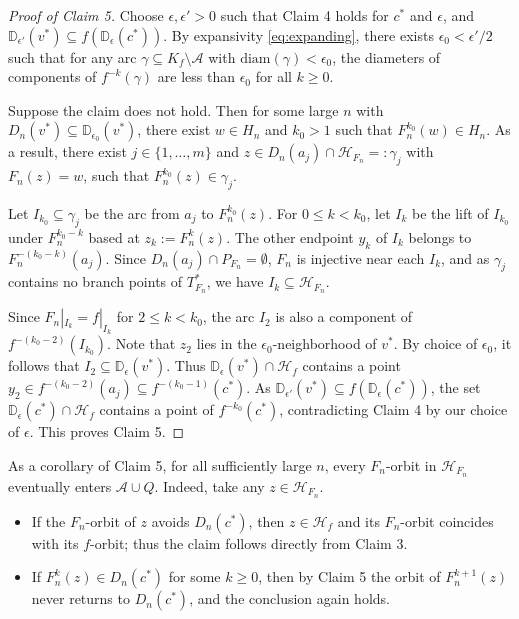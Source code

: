 \documentclass[a4paper,reqno,times, 11pt]{amsart}
\theoremstyle{remark}
\theoremstyle{plain}
\numberwithin{equation}{section}
\def\D{\mathbb D}
\begin{document}
		
		\begin{proof}[Proof of Claim 5]
		 
			\vspace{1pt}
			
			Choose $\epsilon, \epsilon' > 0$ such that Claim 4 holds for $c^*$ and $\epsilon$, and $\D_{\epsilon'}(v^*) \subseteq f(\D_\epsilon(c^*))$. By expansivity \eqref{eq:expanding}, there exists $\epsilon_0 < \epsilon'/2$ such that for any arc $\gamma \subseteq K_f \setminus \mathcal{A}$ with $\mathrm{diam}(\gamma) < \epsilon_0$, the diameters of components of $f^{-k}(\gamma)$ are less than $\epsilon_0$ for all $k \geq 0$.
			

			

				Suppose the claim does not hold. Then for some large $n$ with $D_n(v^*)\subseteq \D_{\epsilon_0}(v^*)$, there exist $w \in H_n$ and $k_0 > 1$ such that $F_n^{k_0}(w) \in H_n$. As a result, there exist $j \in \{1,\ldots,m\}$ and $z \in D_n(a_j) \cap \mathcal{H}_{F_n}=:\gamma_j$ with $F_n(z) = w$, such that $F_n^{k_0}(z) \in \gamma_j$.
				
				Let $I_{k_0} \subseteq \gamma_j$ be the arc from $a_j$ to $F_n^{k_0}(z)$. For $0 \leq k < k_0$, let $I_k$ be the lift of $I_{k_0}$ under $F_n^{k_0-k}$ based at $z_k := F_n^k(z)$. The other endpoint $y_k$ of $I_k$ belongs to $F_n^{-(k_0-k)}(a_j)$. Since $D_n(a_j) \cap P_{F_n} = \emptyset$,  $F_n$ is injective near each $I_k$, and as $\gamma_j$ contains no branch points of $T_{F_n}^*$, we have $I_k \subseteq \mathcal{H}_{F_n}$. 
				
				Since $F_n|_{I_k} = f|_{I_k}$ for $2 \leq k < k_0$, the arc $I_2$ is also a component of $f^{-(k_0-2)}(I_{k_0})$. Note that $z_2$ lies in the $\epsilon_0$-neighborhood of $v^*$. By choice of $\epsilon_0$, it follows that $I_2 \subseteq \D_\epsilon(v^*)$. Thus $\D_\epsilon(v^*) \cap \mathcal{H}_f$ contains a point $y_2 \in f^{-(k_0-2)}(a_j) \subseteq f^{-(k_0-1)}(c^*)$. As $\D_{\epsilon'}(v^*) \subseteq f(\D_\epsilon(c^*))$, the set $\D_\epsilon(c^*) \cap \mathcal{H}_f$ contains a point of $f^{-k_0}(c^*)$, contradicting Claim 4 by our choice of $\epsilon$. This proves  Claim 5.
		\end{proof}
		
As a corollary of Claim 5, for all sufficiently large \(n\), every \(F_n\)-orbit in \(\mathcal{H}_{F_n}\) eventually enters \(\mathcal{A}\cup Q\).  
Indeed, take any \(z\in\mathcal{H}_{F_n}\).  
\begin{itemize}
\item If the \(F_n\)-orbit of \(z\) avoids \(D_n(c^*)\), then \(z\in\mathcal{H}_f\) and its \(F_n\)-orbit coincides with its \(f\)-orbit; thus the claim follows directly from Claim 3.  
\item If \(F_n^k(z)\in D_n(c^*)\) for some \(k\ge0\), then by Claim 5 the orbit of \(F_n^{k+1}(z)\) never returns to \(D_n(c^*)\), and the conclusion again holds.
\end{itemize}
		
\end{document}
